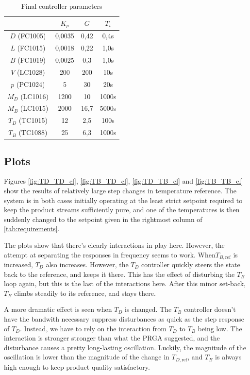 \documentclass[12pt]{article}
\begin{document}
\begin{table}[p]
\centering
\begin{tabular}{c | c | c | c }
& $K_p$ & $G$ & $T_i$ \\ \hline
$D$ (FC1005) & 0,0035 & 0,42& 0,4s\\
$L$ (FC1015) & 0,0018 & 0,22 & 1,0s \\
$B$ (FC1019) & 0,0025 & 0,3 & 1,0s \\
$V$ (LC1028) & 200 & 200 & 10s \\
$p$ (PC1024) & 5 & 30 & 20s \\
$M_D$ (LC1016) & 1200 & 10 & 1000s \\
$M_B$ (LC1015) & 2000 & 16,7 & 5000s \\
$T_D$ (TC1015) & 12 & 2,5 & 100s \\
$T_B$ (TC1088) & 25 & 6,3 & 1000s
\end{tabular}
\caption{Final controller parameters}
\label{tab:final_controller_parameters}
\end{table}


\subsection{Plots}
Figures \ref{fig:TD_TD_cl}, \ref{fig:TB_TD_cl}, \ref{fig:TD_TB_cl} and \ref{fig:TB_TB_cl} show the results of relatively large step changes in temperature reference. The system is in both cases initially operating at the least strict setpoint required to keep the product streams sufficiently pure, and one of the temperatures is then suddenly changed to the setpoint given in the rightmost column of \ref{tab:requirements}.

The plots show that there's clearly interactions in play here. However, the attempt at separating the responses in frequency seems to work. When$T_{B , \textrm{ref}}$ is increased, $T_D$ also increases. However, the $T_D$ controller quickly steers the state back to the reference, and keeps it there. This has the effect of disturbing the $T_B$ loop again, but this is the last of the interactions here. After this minor set-back, $T_B$ climbs steadily to its reference, and stays there.

A more dramatic effect is seen when $T_D$ is changed. The $T_B$ controller doesn't have the bandwith necessary suppress disturbances as quick as the step response of $T_D$. Instead, we have to rely on the interaction from $T_D$ to $T_B$ being low. The interaction is stronger stronger than what the PRGA suggested, and the disturbance causes a pretty long-lasting oscillation. Luckily, the magnitude of the oscillation is lower than the magnitude of the change in $T_{D , \textrm{ref}}$, and $T_B$ is always high enough to keep product quality satisfactory.
\end{document}

